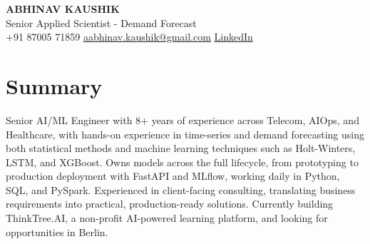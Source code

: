 \documentclass[10pt,a4paper]{article}
\begin{document}
\begin{center}
  {\LARGE\bfseries ABHINAV KAUSHIK}\\[2pt]
  {\large Senior Applied Scientist - Demand Forecast}\\[2pt]
  +91 87005 71859 \textbar{} \href{mailto:aabhinav.kaushik@gmail.com}{aabhinav.kaushik@gmail.com} \textbar{} \href{https://linkedin.com/in/abhinav-kaushik10/}{LinkedIn}  
\end{center}

\section{Summary}
Senior AI/ML Engineer with 8+ years of experience across Telecom, AIOps, and Healthcare, with hands-on experience in time-series and demand forecasting using both statistical methods and machine learning techniques such as Holt-Winters, LSTM, and XGBoost. Owns models across the full lifecycle, from prototyping to production deployment with FastAPI and MLflow, working daily in Python, SQL, and PySpark. Experienced in client-facing consulting, translating business requirements into practical, production-ready solutions. Currently building ThinkTree.AI, a non-profit AI-powered learning platform, and looking for opportunities in Berlin.
\end{document}
